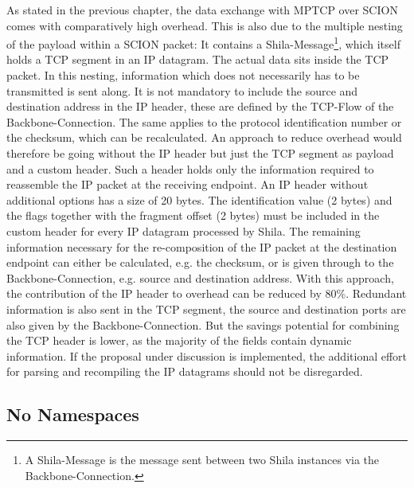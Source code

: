 As stated in the previous chapter, the data exchange with MPTCP over SCION comes with comparatively high overhead. This is also due to the multiple nesting of the payload within a SCION packet: It contains a Shila-Message\footnote{A Shila-Message is the message sent between two Shila instances via the Backbone-Connection.}, which itself holds a TCP segment in an IP datagram. The actual data sits inside the TCP packet. In this nesting, information which does not necessarily has to be transmitted is sent along. It is not mandatory to include the source and destination address in the IP header, these are defined by the TCP-Flow of the Backbone-Connection. The same applies to the protocol identification number or the checksum, which can be recalculated. An approach to reduce overhead would therefore be going without the IP header but just the TCP segment as payload and a custom header. Such a header holds only the information required to reassemble the IP packet at the receiving endpoint. An IP header without additional options has a size of 20 bytes. The identification value (2 bytes) and the flags together with the fragment offset (2 bytes) must be included in the custom header for every IP datagram processed by Shila. The remaining information necessary for the re-composition of the IP packet at the destination endpoint can either be calculated, e.g. the checksum, or is given through to the Backbone-Connection, e.g. source and destination address. With this approach, the contribution of the IP header to overhead can be reduced by 80\%. Redundant information is also sent in the TCP segment, the source and destination ports are also given by the Backbone-Connection. But the savings potential for combining the TCP header is lower, as the majority of the fields contain dynamic information. If the proposal under discussion is implemented, the additional effort for parsing and recompiling the IP datagrams should not be disregarded.
	
\subsection*{No Namespaces}

